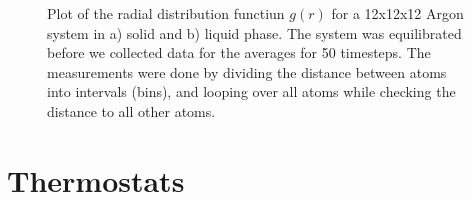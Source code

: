 \begin{figure}
  \begin{center}
  \parbox{5in} {
      \caption {
          \small {
              Plot of the radial distribution functiun $g(r)$ for a 12x12x12 Argon system in a) solid and b) liquid phase. The system was equilibrated before we collected data for the averages for 50 timesteps. The measurements were done by dividing the distance between atoms into intervals (bins), and looping over all atoms while checking the distance to all other atoms.
          }
          \label{fig:o}
      }
  }
  \end{center}
\end{figure}

\section*{Thermostats}

